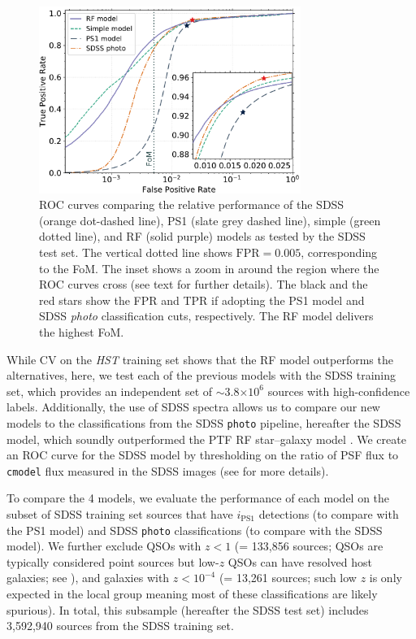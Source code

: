 \documentclass[twocolumn]{aastex62}
\begin{document}
\begin{figure}[t]
 \centering
  \includegraphics[width=3.35in]{./Figures/ROC_curves_log_inset2.pdf}
  \caption{ ROC curves comparing the relative performance of the SDSS (orange
  dot-dashed line), PS1 (slate grey dashed line), simple (green dotted line),
  and RF (solid purple) models as tested by the SDSS test set. The vertical
  dotted line shows $\mathrm{FPR} = 0.005$, corresponding to the FoM. The
  inset shows a zoom in around the region where the ROC curves cross (see
  text for further details). The black and the red stars show the FPR and TPR
  if adopting the PS1 model and SDSS \textit{photo} classification cuts,
  respectively. The RF model delivers the highest FoM.}
  \label{fig:roc_sdss}
\end{figure}

While CV on the \textit{HST} training set shows that the RF model
outperforms the alternatives, here, we test each of the previous models with
the SDSS training set, which provides an independent set of $\sim$3.8$\times
10^6$ sources with high-confidence
labels. Additionally, the use of SDSS spectra allows us to compare our new
models to the classifications from the SDSS \texttt{photo} pipeline,
hereafter the SDSS model, which soundly outperformed the PTF RF star--galaxy
model \citep{Miller17}. We create an ROC curve for the SDSS model by
thresholding on the ratio of PSF flux to \texttt{cmodel} flux measured in the
SDSS images (see \citealt{Miller17} for more details).

To compare the 4 models, we evaluate the performance of each model on the
subset of SDSS training set sources that have $i_\mathrm{PS1}$ detections
(to compare with the PS1 model) and SDSS \texttt{photo} classifications (to
compare with the SDSS model). We further exclude QSOs with $z < 1$ (=
133,856 sources; QSOs are typically considered point sources but low-$z$
QSOs can have resolved host galaxies; see \citealt{Miller17}), and galaxies
with $z < 10^{-4}$ (= 13,261 sources; such low $z$ is only expected in the
local group meaning most of these classifications are likely spurious). In
total, this subsample (hereafter the SDSS test set) includes 3,592,940
sources from the SDSS training set.
\end{document}
